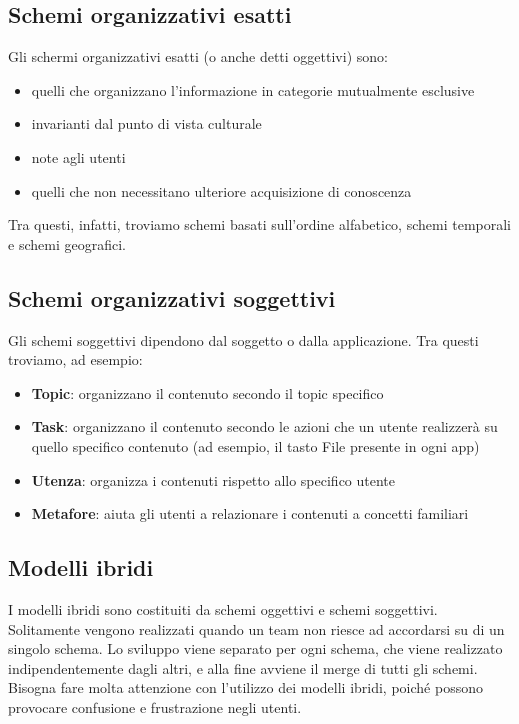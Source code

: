 \subsection{Schemi organizzativi esatti}

Gli schermi organizzativi esatti (o anche detti oggettivi) sono:

\begin{itemize}
	\item quelli che organizzano l'informazione in categorie mutualmente esclusive
	\item invarianti dal punto di vista culturale
	\item note agli utenti
	\item quelli che non necessitano ulteriore acquisizione di conoscenza
\end{itemize} 

Tra questi, infatti, troviamo schemi basati sull'ordine alfabetico, schemi temporali e schemi geografici.

\subsection{Schemi organizzativi soggettivi}

Gli schemi soggettivi dipendono dal soggetto o dalla applicazione. Tra questi troviamo, ad esempio:

\begin{itemize}
	\item \textbf{Topic}: organizzano il contenuto secondo il topic specifico
	\item \textbf{Task}: organizzano il contenuto secondo le azioni che un utente realizzerà su quello specifico contenuto (ad esempio, il tasto File presente in ogni app)
	\item \textbf{Utenza}: organizza i contenuti rispetto allo specifico utente
	\item \textbf{Metafore}: aiuta gli utenti a relazionare i contenuti a concetti familiari
\end{itemize} 

\subsection{Modelli ibridi}

I modelli ibridi sono costituiti da schemi oggettivi e schemi soggettivi. Solitamente vengono realizzati quando un team non riesce ad accordarsi su di un singolo schema. Lo sviluppo viene separato per ogni schema, che viene realizzato indipendentemente dagli altri, e alla fine avviene il merge di tutti gli schemi.
Bisogna fare molta attenzione con l'utilizzo dei modelli ibridi, poiché possono provocare confusione e frustrazione negli utenti.


